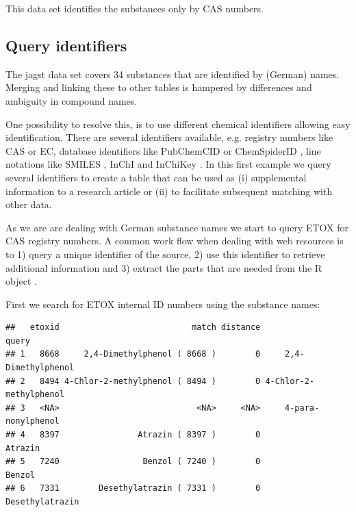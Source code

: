 This data set identifies the substances only by CAS numbers.


\subsection[Query identifiers]{Query identifiers}
The jagst data set covers 34 substances that are identified by (German) names.
Merging and linking these to other tables is hampered by differences and ambiguity in compound names.

One possibility to resolve this, is to use different chemical identifiers allowing easy identification.
There are several identifiers available, e.g.  registry numbers like CAS or EC, database identifiers like PubChemCID \citep{kim2016} or ChemSpiderID \citep{pence_chemspider:_2010}, line notations like SMILES \citep{Weininger_1990}, InChI and InChiKey \citep{Heller_McNaught_Pletnev_Stein_Tchekhovskoi_2015}. 
In this first example we query several identifiers to create a table that can be used as (i) supplemental information to a research article or (ii) to facilitate subsequent matching with other data.

As we are are dealing with German substance names we start to query ETOX for CAS registry numbers.
A common work flow when dealing with web resources is to 1) query a unique identifier of the source, 2) use this identifier to retrieve additional information and 3) extract the parts that are needed from the R object \citep{Chamberlain_Szocs_2013}.

First we search for ETOX internal ID numbers using the substance names:

\begin{knitrout}
\small
\color{fgcolor}\begin{kframe}
\begin{alltt}
 \hlkwb{<-} \hlopt{$}
 \hlkwb{<-}   \hlstd{=} \hlstd{)}
\end{alltt}
\begin{verbatim}
##   etoxid                           match distance                  query
## 1   8668     2,4-Dimethylphenol ( 8668 )        0     2,4-Dimethylphenol
## 2   8494 4-Chlor-2-methylphenol ( 8494 )        0 4-Chlor-2-methylphenol
## 3   <NA>                            <NA>     <NA>     4-para-nonylphenol
## 4   8397                Atrazin ( 8397 )        0                Atrazin
## 5   7240                 Benzol ( 7240 )        0                 Benzol
## 6   7331        Desethylatrazin ( 7331 )        0        Desethylatrazin
\end{verbatim}
\end{kframe}
\end{knitrout}

